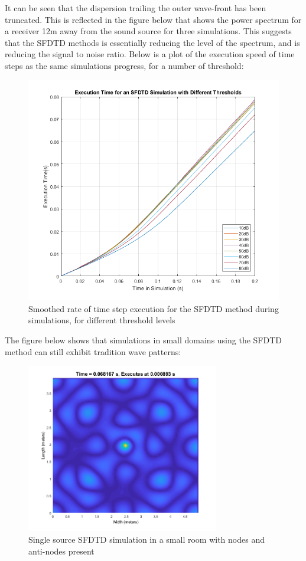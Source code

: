 It can be seen that the dispersion trailing the outer wave-front has been truncated. This is reflected in the figure below that shows the power spectrum for a receiver 12m away from the sound source for three simulations. This suggests that the SFDTD methods is essentially reducing the level of the spectrum, and is reducing the signal to noise ratio. Below is a plot of the execution speed of time steps as the same simulations progress, for a number of threshold: \\

\begin{figure}[H]
\centering
  \includegraphics[width=\textwidth]{./graphics/sfdtd execution speed.png}
  \caption{Smoothed rate of time step execution for the SFDTD method during simulations, for different threshold levels}
\end{figure}

The figure below shows that simulations in small domains using the SFDTD method can still exhibit tradition wave patterns:\\

\begin{figure}[H]
\centering
  \includegraphics[width=0.75\textwidth]{./graphics/sfdtd with wave shapes.png}
  \caption{Single source SFDTD simulation in a small room with nodes and anti-nodes present}
\end{figure}

